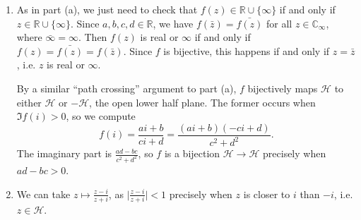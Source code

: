 \begin{enumerate}
\begin{enumerate}
\item As in part (a), we just need to check that $f(z)\in\mathbb{R}\cup\{\infty\}$ if and only if $z\in\mathbb{R}\cup\{\infty\}$. Since $a,b,c,d\in\mathbb{R}$, we have $f(\bar{z}) = \bar{f(z)}$ for all $z\in\mathbb{C}_{\infty}$, where $\bar{\infty} = \infty$. Then $f(z)$ is real or $\infty$ if and only if $f(z) = \bar{f(z)} = f(\bar{z})$. Since $f$ is bijective, this happens if and only if $z = \bar{z}$, i.e. $z$ is real or $\infty$.\par
By a similar ``path crossing'' argument to part (a), $f$ bijectively maps $\mathcal{H}$ to either $\mathcal{H}$ or $-\mathcal{H}$, the open lower half plane. The former occurs when $\Im f(i) > 0$, so we compute
\begin{equation*}
f(i) = \frac{ai + b}{ci + d} = \frac{(ai + b)(-ci + d)}{c^2 + d^2}.
\end{equation*}
The imaginary part is $\frac{ad - bc}{c^2 + d^2}$, so $f$ is a bijection $\mathcal{H}\to\mathcal{H}$ precisely when $ad - bc > 0$.
\item We can take $z\mapsto\frac{z - i}{z + i}$, as $\lvert\frac{z - i}{z + i}\rvert < 1$ precisely when $z$ is closer to $i$ than $-i$, i.e. $z\in\mathcal{H}$.
\end{enumerate}
\end{enumerate}

